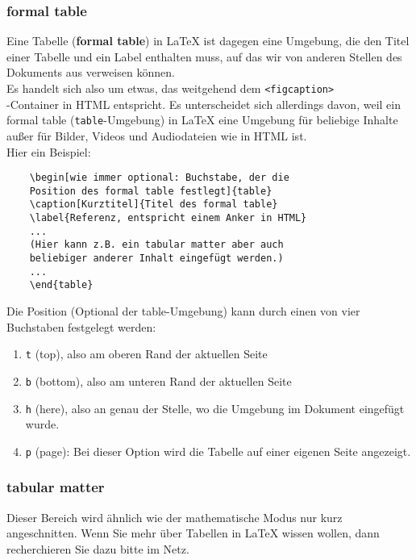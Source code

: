 \subsubsection{formal table}

Eine Tabelle (\textbf{formal table}) in LaTeX ist dagegen eine Umgebung, die den Titel einer Tabelle und ein Label enthalten muss, auf das wir von anderen Stellen des Dokuments aus verweisen können.\\

Es handelt sich also um etwas, das weitgehend dem \verb|<figcaption>|\\-Container in HTML entspricht. Es unterscheidet sich allerdings davon, weil ein formal table (\verb|table|-Umgebung) in LaTeX eine Umgebung für beliebige Inhalte außer für Bilder, Videos und Audiodateien wie in HTML ist.\\

Hier ein Beispiel:

\begin{verbatim}
	\begin[wie immer optional: Buchstabe, der die 
	Position des formal table festlegt]{table}
	\caption[Kurztitel]{Titel des formal table}
	\label{Referenz, entspricht einem Anker in HTML}
	...
	(Hier kann z.B. ein tabular matter aber auch 
	beliebiger anderer Inhalt eingefügt werden.)
	...
	\end{table}
\end{verbatim}

Die Position (Optional der table-Umgebung) kann durch einen von vier Buchstaben festgelegt werden:

\begin{enumerate}
	\item \verb|t| (top), also am oberen Rand der aktuellen Seite
	\item \verb|b| (bottom), also am unteren Rand der aktuellen Seite
	\item \verb|h| (here), also an genau der Stelle, wo die Umgebung im Dokument eingefügt wurde.
	\item \verb|p| (page): Bei dieser Option wird die Tabelle auf einer eigenen Seite angezeigt.
\end{enumerate}

\subsubsection{tabular matter}

Dieser Bereich wird ähnlich wie der mathematische Modus nur kurz angeschnitten. Wenn Sie mehr über Tabellen in LaTeX wissen wollen, dann recherchieren Sie dazu bitte im Netz.\\

